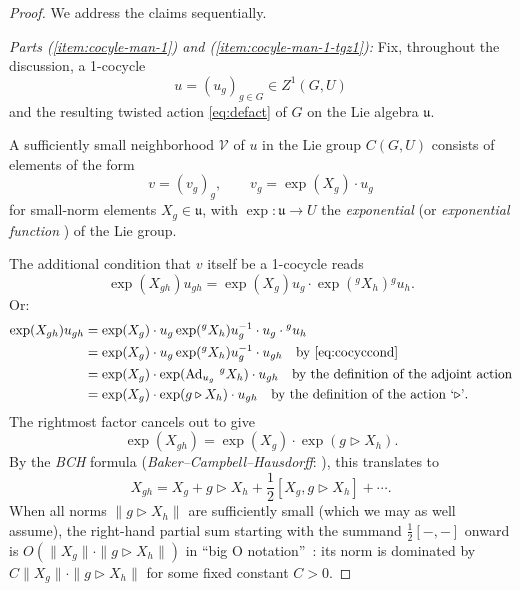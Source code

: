\documentclass[11pt]{article}
\numberwithin{equation}{section}
\numberwithin{equation}{section}
\newcommand\cV{{\mathcal V}}
\newcommand\fu{{\mathfrak u}}
\begin{document}
\begin{proof}
 We address the claims sequentially.

 \emph{Parts {\rm (\ref{item:cocyle-man-1})} and {\rm(\ref{item:cocyle-man-1-tgz1})}:} Fix, throughout the discussion, a 1-cocycle
 \begin{equation*}
 u=(u_g)_{g\in G}\in Z^1(G,U)
 \end{equation*}
 and the resulting twisted action \eqref{eq:defact} of $G$ on the Lie algebra $\fu$.

 A sufficiently small neighborhood $\cV$ of $u$ in the Lie group $C(G,U)$ consists of elements of the form
 \begin{equation*}
 v=(v_g)_g,\qquad v_g = \exp(X_g)\cdot u_g
 \end{equation*}
 for small-norm elements $X_g\in \fu$, with $\exp\colon\fu\to U$ the {\it exponential} (or {\it exponential function} \cite[discussion following Definition IV.1]{neeb-inf} ) of the Lie group.


 The additional condition that $v$ itself be a 1-cocycle reads
 \begin{equation*}
 \exp(X_{gh})u_{gh} = \exp(X_g)u_g \cdot \exp\left({}^gX_h\right){}^gu_h.
 \end{equation*}
 Or:
 \begin{align*}
 \exp(X_{gh})u_{gh} &= \exp(X_g)\cdot u_g\exp({}^gX_h)u_g^{-1}\cdot u_g\cdot{}^gu_h\\
 &= \exp(X_g)\cdot u_g\exp({}^gX_h)u_g^{-1}\cdot u_{gh}
 \quad\text{by \eqref{eq:cocyccond}}\\
 &=\exp(X_g)\cdot \exp(\operatorname{Ad}_{u_g}\,{}^gX_h)\cdot u_{gh}
 \quad\text{by the definition of the adjoint action}\\
 &=\exp(X_g)\cdot \exp(g\triangleright X_h)\cdot u_{gh}
 \quad\text{by the definition of the action `$\triangleright$'}.
 \end{align*}
 The rightmost factor cancels out to give
 \begin{equation*}
 \exp(X_{gh}) = \exp(X_g)\cdot \exp(g\triangleright X_h).
 \end{equation*}
 By the {\it BCH} formula ({\it Baker--Campbell--Hausdorff}: \cite[Definition IV.1.3 and Corollary IV.1.10]{neeb-lc}), this translates to
 \begin{equation*}
 X_{gh} = X_g + g\triangleright X_h + \frac 12\left[X_g,g\triangleright X_h\right] + \cdots.
 \end{equation*}
 When all norms $\|g\triangleright X_h\|$ are sufficiently small (which we may as well assume), the right-hand partial sum starting with the summand $\frac 12[-,-]$ onward is $O(\|X_g\|\cdot \|g\triangleright X_h\|)$ in ``big O notation''~\cite{bigo}: its norm is dominated by $C\|X_g\|\cdot \|g\triangleright X_h\|$ for some fixed constant $C>0$.


\end{proof}
\end{document}
